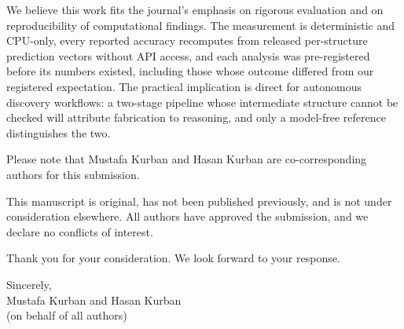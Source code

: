 \documentclass[11pt]{article}
\begin{document}
We believe this work fits the journal's emphasis on rigorous evaluation and on reproducibility of
computational findings. The measurement is deterministic and CPU-only, every reported accuracy recomputes
from released per-structure prediction vectors without API access, and each analysis was pre-registered
before its numbers existed, including those whose outcome differed from our registered expectation. The
practical implication is direct for autonomous discovery workflows: a two-stage pipeline whose intermediate
structure cannot be checked will attribute fabrication to reasoning, and only a model-free reference
distinguishes the two.

Please note that Mustafa Kurban and Hasan Kurban are co-corresponding authors for this submission.

This manuscript is original, has not been published previously, and is not under consideration elsewhere.
All authors have approved the submission, and we declare no conflicts of interest.

Thank you for your consideration. We look forward to your response.

Sincerely,\\
Mustafa Kurban and Hasan Kurban\\
(on behalf of all authors)
\end{document}
